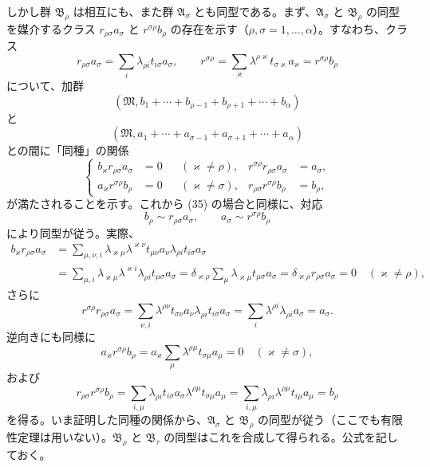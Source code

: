 しかし群 $\mathfrak B_\rho$ は相互にも、また群 $\mathfrak A_\sigma$ とも同型である。まず、$\mathfrak A_\sigma$ と $\mathfrak B_\rho$ の同型を媒介するクラス $r_{\rho\sigma}a_\sigma$ と $r^{\sigma\rho}b_\rho$ の存在を示す（$\rho,\sigma=1,\ldots,\alpha$）。すなわち、クラス
\[
 r_{\rho\sigma}a_\sigma=\sum_i\lambda_{\rho i}t_{i\sigma}a_\sigma,
 \qquad
 r^{\sigma\rho}=\sum_\varkappa\lambda^{\rho\varkappa}t_{\sigma\varkappa}a_\varkappa
 =r^{\sigma\rho}b_\rho
\]
について、加群
\[
 (\mathfrak M,b_1+\cdots+b_{\rho-1}+b_{\rho+1}+\cdots+b_\alpha)
\]
と
\[
 (\mathfrak M,a_1+\cdots+a_{\sigma-1}+a_{\sigma+1}+\cdots+a_\alpha)
\]
との間に「同種」の関係
\begin{equation}
\left\{
\begin{aligned}
 b_\varkappa r_{\rho\sigma}a_\sigma&=0 &&(\varkappa\ne\rho),&
 r^{\sigma\rho}r_{\rho\sigma}a_\sigma&=a_\sigma,\\
 a_\varkappa r^{\sigma\rho}b_\rho&=0 &&(\varkappa\ne\sigma),&
 r_{\rho\sigma}r^{\sigma\rho}b_\rho&=b_\rho,
\end{aligned}\right.
\tag{39}
\end{equation}
が満たされることを示す。これから (35) の場合と同様に、対応
\begin{equation}
 b_\rho\sim r_{\rho\sigma}a_\sigma,
 \qquad
 a_\sigma\sim r^{\sigma\rho}b_\rho
\tag{40}
\end{equation}
により同型が従う。実際、
\[
\begin{aligned}
 b_\varkappa r_{\rho\sigma}a_\sigma
 &=\sum_{\mu,\nu,i}\lambda_{\varkappa\mu}\lambda^{\varkappa\nu}t_{\mu\nu}a_\nu\lambda_{\rho i}t_{i\sigma}a_\sigma\\
 &=\sum_{\mu,i}\lambda_{\varkappa\mu}\lambda^{\varkappa i}\lambda_{\rho i}t_{\mu\sigma}a_\sigma
 =\delta_{\varkappa\rho}\sum_\mu\lambda_{\varkappa\mu}t_{\mu\sigma}a_\sigma
 =\delta_{\varkappa\rho}r_{\rho\sigma}a_\sigma=0\quad(\varkappa\ne\rho),
\end{aligned}
\]
さらに
\[
 r^{\sigma\rho}r_{\rho\sigma}a_\sigma
 =\sum_{\nu,i}\lambda^{\rho\nu}t_{\sigma\nu}a_\nu\lambda_{\rho i}t_{i\sigma}a_\sigma
 =\sum_i\lambda^{\rho i}\lambda_{\rho i}a_\sigma=a_\sigma.
\]
逆向きにも同様に
\[
 a_\varkappa r^{\sigma\rho}b_\rho
 =a_\varkappa\sum_\mu\lambda^{\rho\mu}t_{\sigma\mu}a_\mu=0
 \quad(\varkappa\ne\sigma),
\]
および
\[
 r_{\rho\sigma}r^{\sigma\rho}b_\rho
 =\sum_{i,\mu}\lambda_{\rho i}t_{i\sigma}a_\sigma\lambda^{\rho\mu}t_{\sigma\mu}a_\mu
 =\sum_{i,\mu}\lambda_{\rho i}\lambda^{\rho\mu}t_{i\mu}a_\mu=b_\rho
\]
を得る。いま証明した同種の関係から、$\mathfrak A_\sigma$ と $\mathfrak B_\rho$ の同型が従う（ここでも有限性定理は用いない）。$\mathfrak B_\rho$ と $\mathfrak B_\tau$ の同型はこれを合成して得られる。公式を記しておく。
